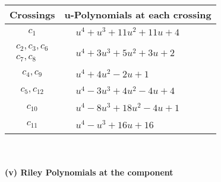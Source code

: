 \documentclass[1p]{elsarticle_modified}
\theoremstyle{definition}
\begin{document}
\begin{tabular}{m{50pt}|m{274pt}}
Crossings & \hspace{64pt}u-Polynomials at each crossing \\
\hline $$\begin{aligned}c_{1}\end{aligned}$$&$\begin{aligned}
&u^4+u^3+11 u^2+11 u+4
\end{aligned}$\\
\hline $$\begin{aligned}c_{2},c_{3},c_{6}\\c_{7},c_{8}\end{aligned}$$&$\begin{aligned}
&u^4+3 u^3+5 u^2+3 u+2
\end{aligned}$\\
\hline $$\begin{aligned}c_{4},c_{9}\end{aligned}$$&$\begin{aligned}
&u^4+4 u^2-2 u+1
\end{aligned}$\\
\hline $$\begin{aligned}c_{5},c_{12}\end{aligned}$$&$\begin{aligned}
&u^4-3 u^3+4 u^2-4 u+4
\end{aligned}$\\
\hline $$\begin{aligned}c_{10}\end{aligned}$$&$\begin{aligned}
&u^4-8 u^3+18 u^2-4 u+1
\end{aligned}$\\
\hline $$\begin{aligned}c_{11}\end{aligned}$$&$\begin{aligned}
&u^4- u^3+16 u+16
\end{aligned}$\\
\hline
\end{tabular}\\~\\
\newpage\renewcommand{\arraystretch}{1}
\flushleft \textbf{(v) Riley Polynomials at the component}\newline \\
\end{document}
